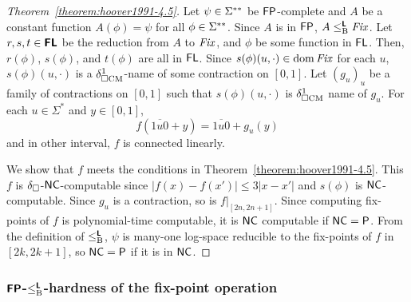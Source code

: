 \documentclass[envcountsame,orivec,oribibl]{llncs}
\begin{document}
\begin{proof}
[Theorem~\ref{theorem:hoover1991-4.5}]
 Let $\psi \in \Sigma ^{**}$ be $\mathsf{FP}$-complete and
 $A$ be a constant function $A(\phi) = \psi$ for all $\phi \in \Sigma ^{**}$.
 Since $A$ is in $\mathsf{FP}$, $A \leq _{\mathrm B} ^{\text{\bfseries \sffamily \upshape L}} \mathit{Fix}$.
 Let $r,s,t \in \text{\bfseries \sffamily \upshape FL}$ be the reduction from $A$ to $\mathit{Fix}$,
 and $\phi$ be some function in $\mathsf{FL}$.
 Then, $r(\phi)$, $s(\phi)$, and $t(\phi)$ are all in $\mathsf{FL}$.
 Since $s(\phi)(u, \cdot) \in \mathop{\rm dom} \mathit{Fix}$ for each $u$,
 $s(\phi)(u, \cdot)$ is a $\delta _{\square \mathrm{CM}}^1$-name of some contraction on $[0,1]$.
 Let $(g_u)_u$ be a family of contractions on $[0,1]$
 such that $s(\phi)(u, \cdot)$ is $\delta _{\square \mathrm{CM}}^1$ name of $g_u$.
 For each $u \in \Sigma^*$ and $y \in [0, 1]$,
 \begin{equation}
  \label{eq:def-f}
 f(\overline{1u0} + y) = \overline{1u0} + g_u(y)
 \end{equation}
 and in other interval, $f$ is connected linearly.

 We show that $f$ meets the conditions in Theorem~\ref{theorem:hoover1991-4.5}.
 This $f$ is $\delta _\square$-$\mathsf{NC}$-computable since 
 $|f(x) - f(x')| \le 3|x-x'|$ and $s(\phi)$ is $\mathsf{NC}$-computable.
 Since $g_u$ is a contraction,  so is $f|_{[2n, 2n+1]}$.
 Since computing fix-points of $f$ is polynomial-time computable,
 it is $\mathsf{NC}$ computable if $\mathsf{NC} = \mathsf{P}$.
 From the definition of $\leq _{\mathrm B} ^{\text{\bfseries \sffamily \upshape L}}$, $\psi$ is many-one log-space
 reducible to the fix-points of $f$ in $[2k, 2k+1]$,
 so $\mathsf{NC} = \mathsf{P}$ if it is in $\mathsf{NC}$.
\end{proof}

\subsubsection{$\text{\bfseries \sffamily \upshape FP}$-$\leq _{\mathrm B} ^{\text{\bfseries \sffamily \upshape L}}$-hardness of the fix-point operation}
\end{document}
